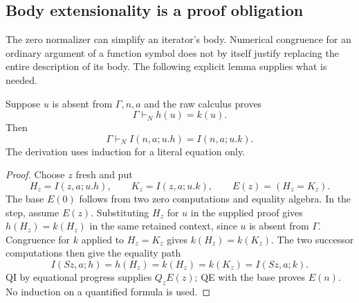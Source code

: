 \subsection{Body extensionality is a proof obligation}

The zero normalizer can simplify an iterator's body.  Numerical
congruence for an ordinary argument of a function symbol does not by
itself justify replacing the entire description of its body.  The
following explicit lemma supplies what is needed.

\begin{lemma}\label{zeroI:body}
Suppose $u$ is absent from $\Gamma,n,a$ and the raw calculus proves
\[
 \Gamma\vdash_N h(u)=k(u).
\]
Then
\[
 \Gamma\vdash_N I(n,a;u.h)=I(n,a;u.k).
\]
The derivation uses induction for a literal equation only.
\end{lemma}
\begin{proof}
Choose $z$ fresh and put
\[
 H_z=I(z,a;u.h),\qquad K_z=I(z,a;u.k),\qquad E(z)=(H_z=K_z).
\]
The base $E(0)$ follows from two zero computations and equality algebra.
In the step, assume $E(z)$.  Substituting $H_z$ for $u$ in the supplied
proof gives $h(H_z)=k(H_z)$ in the same retained context, since $u$ is
absent from $\Gamma$.  Congruence for $k$ applied to $H_z=K_z$ gives
$k(H_z)=k(K_z)$.  The two successor computations then give the equality
path
\[
 I(Sz,a;h)=h(H_z)=k(H_z)=k(K_z)=I(Sz,a;k).
\]
QI by equational progress supplies $Q_zE(z)$; QE with the base proves
$E(n)$.  No induction on a quantified formula is used.
\end{proof}

